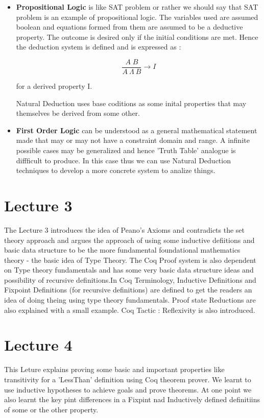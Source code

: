 \documentclass[paper=a4, fontsize=11pt]{scrartcl}
\numberwithin{equation}{section}		%
\numberwithin{figure}{section}			%
\numberwithin{table}{section}				%
\begin{document}
\begin{itemize}
	\item{ \textbf{Propositional Logic} is like SAT problem or rather we should say that SAT problem is an example of propositional logic. The variables used are assumed boolean and equations formed from them are assumed to be a deductive property. The outcome is desired only if the initial conditions are met. Hence the deduction system is defined and is expressed as :

	\[ \dfrac{A \; B}{ A \: \Lambda \: B } \rightarrow I \]

	for a derived property I.

	Natural Deduction uses base coditions as some inital properties that may themselves be derived from some other.
	}

	\item{ \textbf{First Order Logic} can be understood as a general mathematical statement made that may or may not have a constraint domain and range. A infinite possible cases may be generalized and hence 'Truth Table' analogue is diffficult to produce. In this case thus we can use Natural Deduction techniques to develop a more concrete system to analize things. 

	}
\end{itemize}

\section{Lecture 3}
The Lecture 3 introduces the idea of Peano's Axioms and contradicts the set theory approach and argues the approach of using some inductive defiitions and basic data structure to be the more fundamental foundational mathematics theory - the basic idea of Type Theory. The Coq Proof system is also dependent on Type theory fundamentals and has some very basic data structure ideas and possibility of recursive definitions.In Coq Terminology, Inductive Definitions and Fixpoint Definitions (for recursive definitions) are defined to get the readers an idea of doing theing using type theory fundamentals. Proof state Reductions are also explained with a small example. Coq Tactic  : Reflexivity is also introduced. 

\section{Lecture 4}
This Leture explains proving some basic and important properties like transitivity for a 'LessThan' definition using Coq theorem prover. We learnt to use inductive hypotheses to achieve goals and prove theorems. At one point we also learnt the key pint differences in a Fixpint nad Inductively defined definitiins of some or the other property. 
\end{document}
